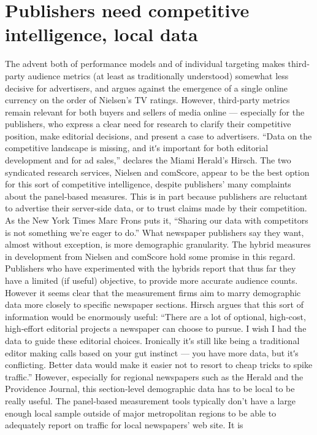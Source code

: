 \section{Publishers need competitive intelligence, local data}
The advent both of performance models and of individual targeting
makes third‐party audience metrics (at least as traditionally understood)
somewhat less decisive for advertisers, and argues against the emergence
of a single online currency on the order of Nielsen’s TV ratings.
However, third‐party metrics remain relevant for both buyers and sellers
of media online — especially for the publishers, who express a clear need
for research to clarify their competitive position, make editorial decisions,
and present a case to advertisers. ``Data on the competitive landscape is
missing, and itʹs important for both editorial development and for ad
sales,'' declares the Miami Herald’s Hirsch.
The two syndicated research services, Nielsen and comScore, appear to be
the best option for this sort of competitive intelligence, despite publishers’
many complaints about the panel‐based measures. This is in part because
publishers are reluctant to advertise their server‐side data, or to trust
claims made by their competition. As the New York Times Marc Frons puts
it, ``Sharing our data with competitors is not something we’re eager to
do.''
What newspaper publishers say they want, almost without exception, is
more demographic granularity. The hybrid measures in development
from Nielsen and comScore hold some promise in this regard. Publishers
who have experimented with the hybrids report that thus far they have a
limited (if useful) objective, to provide more accurate audience counts.
However it seems clear that the measurement firms aim to marry
demographic data more closely to specific newspaper sections. Hirsch
argues that this sort of information would be enormously useful:
``There are a lot of optional, high‐cost, high‐effort editorial projects
a newspaper can choose to pursue. I wish I had the data to guide
these editorial choices. Ironically itʹs still like being a traditional
editor making calls based on your gut instinct — you have more
data, but itʹs conflicting. Better data would make it easier not to
resort to cheap tricks to spike traffic.''
However, especially for regional newspapers such as the Herald and the
Providence Journal, this section‐level demographic data has to be local to be
really useful. The panel‐based measurement tools typically don’t have a
large enough local sample outside of major metropolitan regions to be
able to adequately report on traffic for local newspapers’ web site. It is
